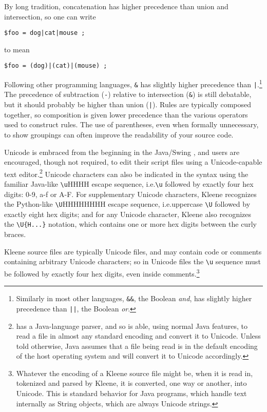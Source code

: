 By long tradition, concatenation has higher precedence
than union and intersection, so one can write  

\begin{Verbatim}
$foo = dog|cat|mouse ; 
\end{Verbatim}

\noindent
to mean

\begin{Verbatim}
$foo = (dog)|(cat)|(mouse) ;
\end{Verbatim}

\noindent
Following other programming languages, \verb!&! has slightly higher
precedence than \verb!|!.\footnote{Similarly in most other languages,
\texttt{\&\&}, the Boolean \emph{and},
has slightly higher precedence than \texttt{||}, the Boolean \emph{or}.}
The precedence of subtraction (\verb!-!) relative to intersection
(\verb!&!) is still debatable, but it should probably be higher than
union (\verb!|!).
Rules are typically composed together, so composition is given lower precedence
than the various operators used to construct rules.  The use of
parentheses, even when formally unnecessary, to show groupings can
often improve the readability of your source code.

Unicode is embraced from the beginning in the Java/Swing , and users
are encouraged, though not required, to edit
their script files using a Unicode-capable text
editor.\footnote{\Kleene{} has a Java-language
parser, and so is able, using normal Java features, to read a file in
almost any standard encoding and convert it to Unicode.  Unless told otherwise,
Java assumes that a file being read is in the default encoding of the
host
operating system and will convert it to Unicode accordingly.}  Unicode
characters can also
be indicated in the syntax using the familiar Java-like \verb!\u!HHHH
escape sequence, i.e.\@ \verb!\u! followed by exactly four hex
digits: 0-9, a-f or A-F.  For
supplementary Unicode characters, Kleene recognizes the Python-like
\verb!\U!HHHHHHHH escape sequence, i.e.\@ uppercase
\verb!\U! followed by exactly eight hex digits; and for any Unicode
character, Kleene also recognizes the
\verb!\U{H...}! notation, which contains one or more hex digits between the
curly braces.

Kleene source files are typically Unicode files, and may contain code or comments
containing arbitrary Unicode characters; so in Unicode files
the \verb!\u!  sequence must be
followed by exactly four hex digits, even inside comments.\footnote{Whatever
the encoding of a Kleene source file might be, when it is read in, tokenized
and parsed by Kleene, it is converted, one way or another, into Unicode.  This
is standard behavior for Java programs, which handle text internally as
String objects, which are always Unicode strings.}

